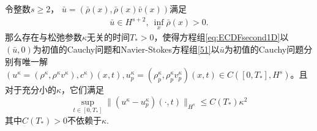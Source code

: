 
\begin{theorem}\label{theoremCE}
令整数$s \ge 2$， ${\bar u} =({\bar \rho}(x),\bar{\rho}(x){\bar v}(x))$满足
  \begin{eqnarray*}
    \bar{u}\in H^{s+2},\ \inf_{x} \bar{\rho}(x)>0.
 \end{eqnarray*}
那么存在与松弛参数$\kappa$无关的时间$T_*>0$，使得方程组\eqref{eq:ECDFsecond1D}以$(\bar{u},0)$为初值的Cauchy问题和Navier-Stokes方程组\eqref{51}以${\bar u}$为初值的Cauchy问题分别有唯一解$(u^\kappa=(\rho^\kappa,\rho^\kappa v^\kappa), c^\kappa)(x,t),u^\kappa_p=(\rho^\kappa_p,\rho^\kappa_p v^\kappa_p)(x,t) \in C([0,T_*], H^s)$。且对于充分小的$\kappa$，它们满足
  \begin{equation}\label{52}
    \sup_{t \in [0, T_*]} \|(u^\kappa-u^\kappa_p)(\cdot,t)\|_{H^s} \le C(T_*) \kappa^2
  \end{equation}
 其中$C(T_*)>0$不依赖于$\kappa$.
\end{theorem}


